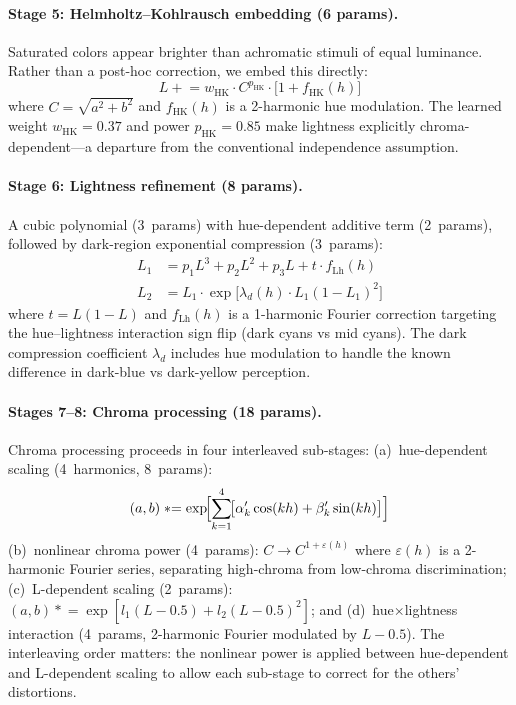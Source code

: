 \documentclass[11pt, twocolumn]{article}
\begin{document}
\paragraph{Stage 5: Helmholtz--Kohlrausch embedding (6 params).}
Saturated colors appear brighter than achromatic stimuli of equal
luminance. Rather than a post-hoc correction, we embed this directly:
\begin{equation}
  L \mathrel{+}= w_\mathrm{HK} \cdot C^{p_\mathrm{HK}} \cdot \bigl[1 + f_\mathrm{HK}(h)\bigr]
  \label{eq:hk}
\end{equation}
where $C = \sqrt{a^2+b^2}$ and $f_\mathrm{HK}(h)$ is a 2-harmonic
hue modulation. The learned weight $w_\mathrm{HK} = 0.37$ and power
$p_\mathrm{HK} = 0.85$ make lightness explicitly chroma-dependent---a
departure from the conventional independence assumption.

\paragraph{Stage 6: Lightness refinement (8 params).}
A cubic polynomial (3~params) with hue-dependent additive term
(2~params), followed by dark-region exponential compression (3~params):
\begin{align}
  L_1 &= p_1 L^3 + p_2 L^2 + p_3 L + t \cdot f_\mathrm{Lh}(h) \\
  L_2 &= L_1 \cdot \exp\!\bigl[\lambda_d(h) \cdot L_1(1-L_1)^2\bigr]
\end{align}
where $t = L(1-L)$ and $f_\mathrm{Lh}(h)$ is a 1-harmonic Fourier
correction targeting the hue--lightness interaction sign flip (dark
cyans vs mid cyans). The dark compression coefficient $\lambda_d$
includes hue modulation to handle the known difference in dark-blue
vs dark-yellow perception.

\paragraph{Stages 7--8: Chroma processing (18 params).}
Chroma processing proceeds in four interleaved sub-stages:
(a)~hue-dependent scaling (4~harmonics, 8~params):
\begin{equation}
  (a,b) \mathrel{*}= \exp\!\Bigl[\sum_{k=1}^{4}\!\bigl[\alpha'_k\cos(kh) + \beta'_k\sin(kh)\bigr]\Bigr]
\end{equation}
(b)~nonlinear chroma power (4~params): $C \to C^{1+\varepsilon(h)}$
where $\varepsilon(h)$ is a 2-harmonic Fourier series, separating
high-chroma from low-chroma discrimination;
(c)~L-dependent scaling (2~params):
$(a,b) \mathrel{*}= \exp[l_1(L-0.5) + l_2(L-0.5)^2]$; and
(d)~hue$\times$lightness interaction (4~params, 2-harmonic Fourier
modulated by $L-0.5$). The interleaving order matters: the nonlinear
power is applied between hue-dependent and L-dependent scaling to
allow each sub-stage to correct for the others' distortions.
\end{document}
